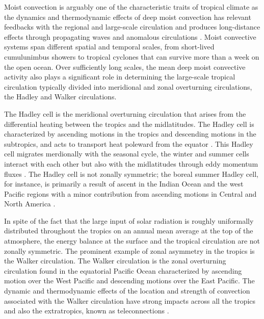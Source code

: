 
 Moist convection is arguably one of the characteristic traits of tropical climate as the dynamics and thermodynamic effects of deep moist convection has relevant feedbacks with the regional and large-scale circulation \citep{emanuel1994atmospheric,webster2020dynamics} and produces long-distance effects through propagating waves and anomalous circulations \citep{hartmann2015,li2018fundamentals}.
 Moist convective systems span different spatial and temporal scales, from short-lived cumulunimbus showers to tropical cyclones that can survive more than a week on the open ocean. Over sufficiently long scales, the mean deep moist convective activity also plays a significant role in determining the large-scale tropical circulation typically divided into meridional and zonal overturning circulations, the Hadley and Walker circulations.
 
The Hadley cell is the meridional overturning circulation that arises from the differential heating between the tropics and the midlatitudes. The Hadley cell is characterized by ascending motions in the tropics and descending motions in the subtropics, and acts to transport heat poleward from the equator \citep{lorenz1967}.  This Hadley cell migrates merdionally with the seasonal cycle, the winter and summer cells interact with each other but also with the midlatitudes through eddy momentum fluxes \citep{bordoni2008monsoons}. 
The Hadley cell is not zonally symmetric; the boreal summer Hadley cell, for instance,  is primarily a result of ascent in the Indian Ocean and the west Pacific regions with a minor contribution from ascending motions in Central and North America \citep{hoskins2020}. 

In spite of the fact that the large input of solar radiation is roughly uniformally distributed throughout the tropics on an annual mean average at the top of the atmosphere, the energy balance at the surface and the tropical circulation are not zonally symmetric. The prominent example of zonal asymmetry in the tropics is the Walker circulation. 
The Walker circulation is the zonal overturning circulation found in the equatorial Pacific Ocean characterized by ascending motion over the West Pacific and descending motions over the East Pacific\citep{walker1924,bjerknes1969,gill1980}. The dynamic and thermodynamic effects of the location and strength of convection associated with the Walker circulation have strong impacts across all the tropics and also the extratropics, known as teleconnections \citep{cai2019pantropical}.

